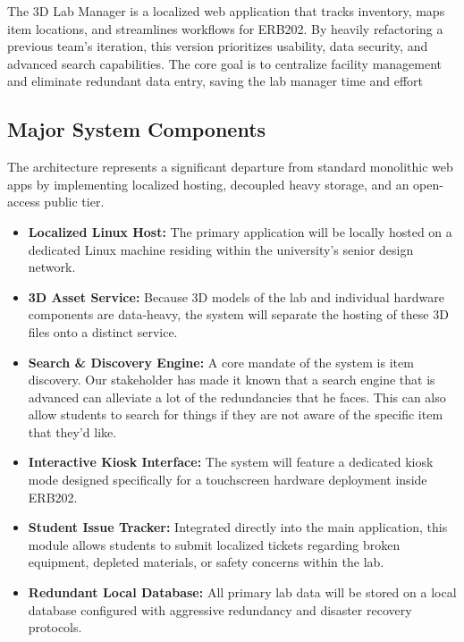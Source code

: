 The 3D Lab Manager is a localized web application that tracks inventory, maps item locations, and streamlines workflows for ERB202. By heavily refactoring a previous team's iteration, this version prioritizes usability, data security, and advanced search capabilities. The core goal is to centralize facility management and eliminate redundant data entry, saving the lab manager time and effort

\subsection*{Major System Components}
The architecture represents a significant departure from standard monolithic web apps by implementing localized hosting, decoupled heavy storage, and an open-access public tier.

\begin{itemize}
    \item \textbf{Localized Linux Host:} The primary application will be locally hosted on a dedicated Linux machine residing within the university's senior design network.
    
    \item \textbf{3D Asset Service:} Because 3D models of the lab and individual hardware components are  data-heavy, the system will separate the hosting of these 3D files onto a distinct service.
    
    \item \textbf{ Search \& Discovery Engine:} A core mandate of the system is item discovery. Our stakeholder has made it known that a search engine that is advanced can alleviate a lot of the redundancies that he faces. This can also allow students to search for things if they are not aware of the specific item that they'd like.
    
    \item \textbf{Interactive Kiosk Interface:} The system will feature a dedicated kiosk mode designed specifically for a touchscreen hardware deployment inside ERB202.
    
    \item \textbf{Student Issue Tracker:} Integrated directly into the main application, this module allows students to submit localized tickets regarding broken equipment, depleted materials, or safety concerns within the lab.
    
    \item \textbf{Redundant Local Database:} All primary lab data will be stored on a local database configured with aggressive redundancy and disaster recovery protocols.
\end{itemize}